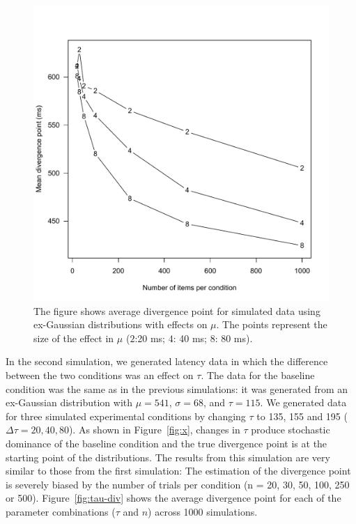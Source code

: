 \documentclass[man]{apa}%
\begin{document}
          
\begin{figure}[h] %
	\includegraphics[width=5in]{Figure5.pdf}
	\caption{The figure shows average divergence point for simulated data using ex-Gaussian distributions with effects on $\mu$. The points represent the size of the effect in $\mu$ ($2$:20 ms; $4$: 40 ms; $8$: 80 ms).}
		\label{fig:mu-div}
\end{figure}
  
      In the second simulation, we generated latency data in which the difference between the two conditions was an effect on $\tau$.  The data for the baseline condition was the same as in the previous simulations: it was generated from an ex-Gaussian distribution with $\mu= 541$, $\sigma = 68$, and $\tau = 115$.  We generated data for three simulated experimental conditions by changing $\tau$ to 135, 155 and 195  ($\Delta \tau = 20, 40, 80$). As shown in Figure~\ref{fig:x}, changes in $\tau$  produce stochastic dominance of the baseline condition and the true divergence point is at the starting point of the distributions.   The results from this simulation are very similar to those from the first simulation: The estimation of the divergence point is severely biased by the number of trials per condition (n = 20, 30, 50, 100, 250 or 500).   Figure~\ref{fig:tau-div} shows the average divergence point for each of the parameter combinations ($\tau$ and $n$) across 1000 simulations.
   
\end{document}
